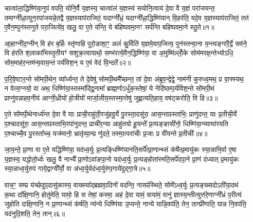 \setcounter{anuvakam}{0}
चात्वा॑ला॒द्धिष्णि॑या॒नुप॑ वपति॒ योनि॒र्वै य॒ज्ञस्य॒ चात्वा॑लं य॒ज्ञस्य॑ सयोनि॒त्वाय॑ दे॒वा वै य॒ज्ञं परा॑जयन्त॒ तमाग्नी᳚ध्रा॒त्पुन॒रपा॑जयन्ने॒तद्वै य॒ज्ञस्याप॑राजितं॒ यदाग्नी᳚ध्रं॒ यदाग्नी᳚ध्रा॒द्धिष्णि॑यान् वि॒हर॑ति॒ यदे॒व य॒ज्ञस्याप॑राजितं॒ तत॑ ए॒वैन॒म्पुन॑स्तनुते परा॒जित्ये॑व॒ खलु॒ वा ए॒ते य॑न्ति॒ ये ब॑हिष्पवमा॒नꣳ सर्प॑न्ति बहिष्पवमा॒ने स्तु॒ते॥१॥

आ॒हाग्नी॑द॒ग्नीन् वि ह॑र ब॒र्\mbox{}हिः स्तृ॑णाहि पुरो॒डाशा॒ꣳ॒ अलं॑ कु॒र्विति॑ य॒ज्ञमे॒वाप॒जित्य॒ पुन॑स्तन्वा॒ना य॒न्त्यङ्गा॑रै॒र्द्वे सव॑ने॒ वि ह॑रति श॒लाका॑भिस्तृ॒तीयꣳ॑ सशुक्र॒त्वायाथो॒ सम्भ॑रत्ये॒वैन॒द्धिष्णि॑या॒ वा अ॒मुष्मि॑ल्लोँ॒के सोम॑मरक्ष॒न्तेभ्यो\-ऽधि॒ सोम॒माह॑र॒न्तम॑न्व॒वाय॒न्तं पर्य॑विश॒न् य ए॒वं वेद॑ वि॒न्दते᳚॥२॥

प॒रि॒वे॒ष्टार॒न्ते सो॑मपी॒थेन॒ व्या᳚र्ध्यन्त॒ ते दे॒वेषु॑ सोमपी॒थमै᳚च्छन्त॒ तां दे॒वा अ॑ब्रुव॒न्द्वेद्वे॒ नाम॑नी कुरुध्व॒मथ॒ प्र वा॒फ्स्यथ॒ न वेत्य॒ग्नयो॒ वा अथ॒ धिष्णि॑या॒स्तस्मा᳚द्द्वि॒नामा᳚ ब्राह्म॒णो\-ऽर्धु॑क॒स्तेषां॒ ये नेदि॑ष्ठम्प॒र्यवि॑श॒न्ते सो॑मपी॒थं प्राप्नु॑वन्नाहव॒नीय॑ आग्नी॒ध्रीयो॑ हो॒त्रीयो॑ मार्जा॒लीय॒स्तस्मा॒त्तेषु॑ जुह्वत्यति॒हाय॒ वष॑ट्करोति॒ वि हि॥३॥

ए॒ते सो॑मपी॒थेनार्ध्य॑न्त दे॒वा वै याः प्राची॒राहु॑ती॒रजु॑हवु॒र्ये पु॒रस्ता॒दसु॑रा॒ आस॒न्ताꣴस्ताभिः॒ प्राणु॑दन्त॒ याः प्र॒तीची॒र्ये प॒श्चादसु॑रा॒ आस॒न्ताꣴस्ताभि॒रपा॑नुदन्त॒ प्राची॑र॒न्या आहु॑तयो हू॒यन्ते᳚ प्र॒त्यङ्ङासी॑नो॒ धिष्णि॑या॒न्व्याघा॑रयति प॒श्चाच्चै॒व पु॒रस्ता᳚च्च॒ यज॑मानो॒ भ्रातृ॑व्या॒न्प्र णु॑दते॒ तस्मा॒त्परा॑चीः प्र॒जाः प्र वी॑यन्ते प्र॒तीचीः᳚॥४॥

जा॒य॒न्ते॒ प्रा॒णा वा ए॒ते यद्धिष्णि॑या॒ यद॑ध्व॒र्युः प्र॒त्यङ्धिष्णि॑यानति॒सर्पे᳚त्प्रा॒णान्थ्सं क॑र्\mbox{}षेत्प्र॒मायु॑कः स्या॒न्नाभि॒र्वा ए॒षा य॒ज्ञस्य॒ यद्धोतो॒र्ध्वः खलु॒ वै नाभ्यै᳚ प्रा॒णो\-ऽवा॑ङपा॒नो यद॑ध्व॒र्युः प्र॒त्यङ्होता॑रमति॒सर्पे॑दपा॒ने प्रा॒णं द॑ध्यात् प्र॒मायु॑कः स्या॒न्नाध्व॒र्युरुप॑ गाये॒द्वाग्वी᳚र्यो॒ वा अ॑ध्व॒र्युर्यद॑ध्व॒र्युरु॑प॒गाये॑दुद्गा॒त्रे॥५॥

वाच॒ꣳ॒ सम्प्र य॑च्छेदुप॒दासु॑कास्य॒ वाख्स्या᳚द्ब्रह्मवा॒दिनो॑ वदन्ति॒ नासꣴ॑स्थिते॒ सोमे᳚\-ऽध्व॒र्युः प्र॒त्यङ्ख्सदो\-ऽती॑या॒दथ॑ क॒था दा᳚क्षि॒णानि॒ होतु॑मेति॒ यामो॒ हि स तेषां॒ कस्मा॒ अह॑ दे॒वा यामं॒ वाया॑मं॒ वानु॑ ज्ञास्य॒न्तीत्युत्त॑रे॒णाग्नी᳚ध्रं प॒रीत्य॑ जुहोति दाक्षि॒णानि॒ न प्रा॒णान्थ्सं क॑र्\mbox{}षति॒ न्य॑न्ये धिष्णि॑या उ॒प्यन्ते॒ नान्ये यान्नि॒वप॑ति॒ तेन॒ तान्प्री॑णाति॒ यान्न नि॒वप॑ति॒ यद॑नुदि॒शति॒ तेन॒ तान्॥६॥

